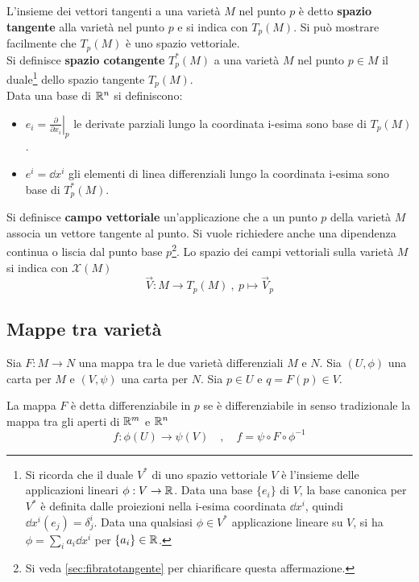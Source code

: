 L'insieme dei vettori tangenti a una varietà $M$ nel punto $p$ è detto
\textbf{spazio tangente} alla varietà nel punto $p$ e si indica con $T_p(M)$.
Si può mostrare facilmente che $T_p(M)$ è uno spazio vettoriale.\\

Si definisce \textbf{spazio cotangente} $T_p^*(M)$ a una varietà $M$ nel punto
$p \in M$ il duale\footnote{
   Si ricorda che il duale $V^*$ di uno spazio vettoriale $V$ è l'insieme
   delle applicazioni lineari $\phi : V \to \mathbb{R}$. Data una base $\{e_i\}$ di $V$,
   la base canonica per $V^*$ è definita dalle proiezioni nella i-esima coordinata $\dd x^i$,
   quindi $\dd x^i(e_j)=\delta^i_j$. Data una qualsiasi $\phi\in V^*$ applicazione lineare
   su $V$, si ha $\phi = \sum_i a_i \dd x^i$ per $\{a_i\}\in\mathbb{R}$. }
dello spazio tangente $T_p(M)$.\\

Data una base di $\mathbb{R}^n$ si definiscono:
\begin{itemize}
   \item $ e_i = \left. \frac{\partial}{\partial x_i}\right |_p $
      le derivate parziali lungo la coordinata i-esima sono base di $T_p(M)$.
   \item $ e^i = \dd x^i $ gli elementi di linea differenziali lungo la
      coordinata i-esima sono base di $T_p^*(M)$.
\end{itemize}

Si definisce \textbf{campo vettoriale} un'applicazione che a un punto $p$
della varietà $M$ associa un vettore tangente al punto. Si vuole richiedere anche
una dipendenza continua o liscia dal punto base $p$\footnote{Si veda \ref{sec:fibratotangente}
per chiarificare questa affermazione.}.
Lo spazio dei campi vettoriali sulla varietà $M$ si indica con $\mathcal{X}(M)$
$$ \vec V : M \to T_p(M) \: ,\: p \mapsto \vec V _p $$

\subsection{Mappe tra varietà}
Sia $F : M \to N$ una mappa tra le due varietà differenziali $M$ e $N$.
Sia $(U,\phi)$ una carta per $M$ e $(V,\psi)$ una carta per $N$. Sia $p \in U$ e
$q = F(p) \in V$.

\begin{definition}
   La mappa $F$ è detta differenziabile in $p$ se è differenziabile
   in senso tradizionale la mappa tra gli aperti di $\mathbb{R}^m$ e
   $\mathbb{R}^n$
   $$ f : \phi(U) \to \psi(V) \quad , \quad f = \psi \circ F \circ \phi^{-1} $$
\end{definition}

